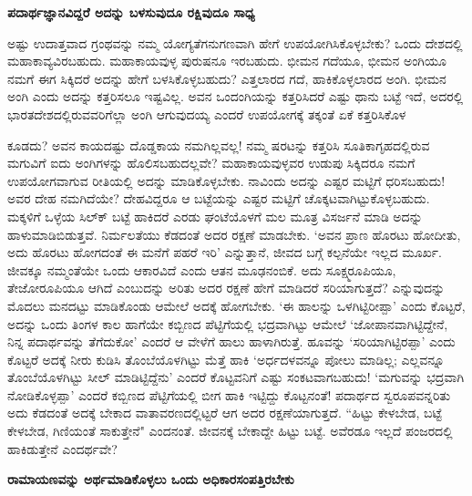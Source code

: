 {\bf ಪದಾರ್ಥಜ್ಞಾನವಿದ್ದರೆ ಅದನ್ನು ಬಳಸುವುದೂ ರಕ್ಷಿವುದೂ ಸಾಧ್ಯ} 


ಅಷ್ಟು ಉದಾತ್ತವಾದ ಗ್ರಂಥವನ್ನು ನಮ್ಮ ಯೋಗ್ಯತೆಗನುಗಣವಾಗಿ ಹೇಗೆ ಉಪಯೋಗಿಸಿಕೊಳ್ಳಬೇಕು? ಒಂದು ದೇಶದಲ್ಲಿ ಮಹಾಕಾವ್ಯವಿರಬಹುದು. ಮಹಾಕಾಯವುಳ್ಳ ಪುರುಷನೂ ಇರಬಹುದು. ಭೀಮನ ಗದೆಯೂ, ಭೀಮನ ಅಂಗಿಯೂ ನಮಗೆ ಈಗ ಸಿಕ್ಕಿದರೆ ಅದನ್ನು ಹೇಗೆ ಬಳಸಿಕೊಳ್ಳಬಹುದು? ಎತ್ತಲಾರದ ಗದೆ, ಹಾಕಿಕೊಳ್ಳಲಾರದ ಅಂಗಿ. ಭೀಮನ ಅಂಗಿ ಎಂದು ಅದನ್ನು ಕತ್ತರಿಸಲೂ ಇಷ್ಟವಿಲ್ಲ. ಅವನ ಒಂದಂಗಿಯನ್ನು ಕತ್ತರಿಸಿದರೆ ಎಷ್ಟು ಥಾನು ಬಟ್ಟೆ ಇದೆ, ಅದರಲ್ಲಿ ಭಾರತದೇಶದಲ್ಲಿರುವವರಿಗೆಲ್ಲಾ ಅಂಗಿ ಆಗುವುದಯ್ಯ ಎಂದರೆ ಉಪಯೋಗಕ್ಕೆ ತಕ್ಕಂತೆ ಏಕೆ ಕತ್ತರಿಸಿಕೊಳ


ಕೂಡದು? ಅವನ ಕಾಯದಷ್ಟು ದೊಡ್ಡಕಾಯ ನಮಗಿಲ್ಲವಲ್ಲ! ನಮ್ಮ ಷರಟನ್ನು ಕತ್ತರಿಸಿ ಸೂತಿಕಾಗೃಹದಲ್ಲಿರುವ ಮಗುವಿಗೆ ಐದು ಅಂಗಿಗಳನ್ನು ಹೊಲಿಸಬಹುದಲ್ಲವೇ? ಮಹಾಕಾಯವುಳ್ಳವರ ಉಡುಪು ಸಿಕ್ಕಿದರೂ ನಮಗೆ ಉಪಯೋಗವಾಗುವ ರೀತಿಯಲ್ಲಿ ಅದನ್ನು ಮಾಡಿಕೊಳ್ಳಬೇಕು. ನಾವಿಂದು ಅದನ್ನು ಎಷ್ಟರ ಮಟ್ಟಿಗೆ ಧರಿಸಬಹುದು! ಅವರ ದೇಹ ನಮಗಿದೆಯೇ? ದೇಹವಿದ್ದರೂ ಆ ಬಟ್ಟೆಯನ್ನು ಎಷ್ಟರ ಮಟ್ಟಿಗೆ ಚೊಕ್ಕಟವಾಗಿಟ್ಟುಕೊಳ್ಳಬಹುದು. ಮಕ್ಕಳಿಗೆ ಒಳ್ಳೆಯ ಸಿಲ್ಕ್‍ ಬಟ್ಟೆ ಹಾಕಿದರೆ ಎರಡು ಘಂಟೆಯೊಳಗೆ ಮಲ ಮೂತ್ರ ವಿಸರ್ಜನೆ ಮಾಡಿ ಅದನ್ನು ಹಾಳುಮಾಡಿಬಿಡುತ್ತವೆ. ನಿರ್ಮಲತೆಯು ಕೆಡದಂತೆ ಅದರ ರಕ್ಷಣೆ ಮಾಡಬೇಕು. `ಅವನ ಪ್ರಾಣ ಹೊರಟು ಹೋದೀತು, ಅದು ಹೊರಟು ಹೋಗದಂತೆ ಈ ಮನೆಗೆ ಪಹರೆ ಇರಿ' ಎನ್ನುತ್ತಾನೆ, ಜೀವದ ಬಗ್ಗೆ ಕಲ್ಪನೆಯೇ ಇಲ್ಲದ ಮೂರ್ಖ. ಜೀವಕ್ಕೂ ನಮ್ಮಂತೆಯೇ ಒಂದು ಆಕಾರವಿದೆ ಎಂದು ಆತನ ಮೂಢನಂಬಿಕೆ. ಅದು ಸೂಕ್ಷ್ಮರೂಪಿಯೂ, ತೇಜೋರೂಪಿಯೂ ಆಗಿದೆ ಎಂಬುದನ್ನು ಅರಿತು ಅದರ ರಕ್ಷಣೆ ಹೇಗೆ ಮಾಡಿದರೆ ಸರಿಯಾಗುತ್ತದೆ? ಎನ್ನುವುದನ್ನು ಮೊದಲು ಮನದಟ್ಟು ಮಾಡಿಕೊಂಡು ಆಮೇಲೆ ಅದಕ್ಕೆ ಹೋಗಬೇಕು. `ಈ ಹಾಲನ್ನು ಒಳಗಿಟ್ಟಿರೀಪ್ಪಾ' ಎಂದು ಕೊಟ್ಟರೆ, ಅದನ್ನು ಒಂದು ತಿಂಗಳ ಕಾಲ ಹಾಗೆಯೇ ಕಬ್ಬಿಣದ ಪೆಟ್ಟಿಗೆಯಲ್ಲಿ ಭದ್ರವಾಗಿಟ್ಟು ಆಮೇಲೆ `ಜೋಪಾನವಾಗಿಟ್ಟಿದ್ದೇನೆ, ನಿನ್ನ ಪದಾರ್ಥವನ್ನು ತೆಗೆದುಕೋ' ಎಂದರೆ ಆ ವೇಳೆಗೆ ಹಾಲು ಹಾಳಾಗಿರುತ್ತೆ. ಹೂವನ್ನು `ಸರಿಯಾಗಿಟ್ಟಿರಪ್ಪಾ' ಎಂದು ಕೊಟ್ಟರೆ ಅದಕ್ಕೆ ನೀರು ಕುಡಿಸಿ ತೊಂಬೆಯೊಳಗಿಟ್ಟು ಮೆತ್ತೆ ಹಾಕಿ `ಅರ್ಧದಳವನ್ನೂ ಪೋಲು ಮಾಡಿಲ್ಲ; ಎಲ್ಲವನ್ನೂ ತೊಂಬೆಯೊಳಗಿಟ್ಟು ಸೀಲ್‍ ಮಾಡಿಟ್ಟಿದ್ದೆನು' ಎಂದರೆ ಕೊಟ್ಟವನಿಗೆ ಎಷ್ಟು ಸಂಕಟವಾಗಬಹುದು! `ಮಗುವನ್ನು ಭದ್ರವಾಗಿ ನೋಡಿಕೊಳ್ಳಪ್ಪಾ' ಎಂದರೆ ಕಬ್ಬಿಣದ ಪೆಟ್ಟಿಗೆಯಲ್ಲಿ ಬೀಗ ಹಾಕಿ ಇಟ್ಟಿದ್ದು ಕೊಟ್ಟನಂತೆ! ಪದಾರ್ಥದ ಸ್ವರೂಪವನ್ನರಿತು ಅದು ಕೆಡದಂತೆ ಅದಕ್ಕೆ ಬೇಕಾದ ವಾತಾವರಣದಲ್ಲಿಟ್ಟರೆ ಆಗ ಅದರ ರಕ್ಷಣೆಯಾಗುತ್ತದೆ. ``ಹಿಟ್ಟು ಕೇಳಬೇಡ, ಬಟ್ಟೆ ಕೇಳಬೇಡ, ಗಿಣಿಯಂತೆ ಸಾಕುತ್ತೇನೆ" ಎಂದನಂತೆ. ಜೀವನಕ್ಕೆ ಬೇಕಾದ್ದೇ ಹಿಟ್ಟು ಬಟ್ಟೆ. ಅವೆರಡೂ ಇಲ್ಲದೆ ಪಂಜರದಲ್ಲಿ ಹಾಕಿಡುತ್ತೇನೆ ಎಂದರ್ಥವೇ? 


{\bf ರಾಮಾಯಣವನ್ನು ಅರ್ಥಮಾಡಿಕೊಳ್ಳಲು ಒಂದು ಅಧಿಕಾರಸಂಪತ್ತಿರಬೇಕು} 


